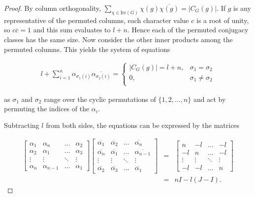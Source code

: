 \documentclass[12pt,letterpaper]{article}
\begin{document}
\begin{proof}
By column orthogonality,
$\sum_{\chi\in\mathrm{Irr}(G)}\chi(g)\overline{\chi(g)} = |C_G(g)|$. If
$g$ is any representative of the permuted columns, each character
value $c$ is a root of unity, so $c\overline{c}=1$ and this sum
evaluates to $l+n$. Hence each of the permuted conjugacy classes has
the same size. Now consider the other inner products among the
permuted columns. This yields the system of equations 

\begin{align*}
l + \sum_{i=1}^n \alpha_{\sigma_1(i)}\overline{\alpha_{\sigma_2(i)}} = 
\begin{cases}
  |C_G(g)| = l+n,& \sigma_1=\sigma_2\\
  0,&\sigma_1\neq\sigma_2\\
\end{cases}
\end{align*}

as $\sigma_1$ and $\sigma_2$ range over the cyclic permutations of
$\{1,2,\ldots,n\}$ and act by permuting the indices of the $\alpha_i$.

Subtracting $l$ from both sides, the equations can be expressed by the
matrices

\begin{align*}
\begin{bmatrix}
\alpha_1    & \alpha_{n} & \hdots & \alpha_2\\
\alpha_2    & \alpha_1    & \hdots & \alpha_3\\
\vdots      & \vdots     & \ddots & \vdots\\
\alpha_{n} & \alpha_{n-1} & \hdots & \alpha_1
\end{bmatrix}
\begin{bmatrix}
\overline{\alpha_1}    & \overline{\alpha_2} & \hdots & \overline{\alpha_{n}}\\
\overline{\alpha_{n}} & \overline{\alpha_1} & \hdots & \overline{\alpha_{n-1}}\\
\vdots      & \vdots   & \ddots & \vdots\\
\overline{\alpha_2}    & \overline{\alpha_3} & \hdots & \overline{\alpha_1} 
\end{bmatrix}
 & = &
\begin{bmatrix}
n    & -l & \hdots & -l\\
-l & n & \hdots & -l\\
\vdots      & \vdots   & \ddots & \vdots\\
-l    & -l & \hdots & n 
\end{bmatrix} \\ & = &
nI-l(J-I).
\end{align*}


\end{proof}
\end{document}
